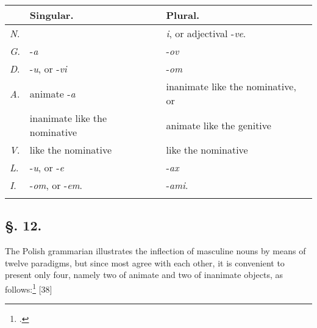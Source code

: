 \newpage

\begin{longtable}{ l l l }
    \lsptoprule
    & Singular. & Plural. \\
    \midrule
    \textit{N}. & & \textit{i}, or adjectival -\textit{ve}. \\
    \textit{G}. & -\textit{a} & -\textit{ov} \\
    \textit{D}. & -\textit{u}, or -\textit{vi} & -\textit{om} \\ 
    \textit{A}. & animate -\textit{a} & inanimate like the nominative, or \\
    & inanimate like the nominative & animate like the genitive \\
    \textit{V}. & like the nominative & like the nominative \\
    \textit{L}. & -\textit{u}, or -\textit{e} & -\textit{ax} \\
    \textit{I}. & -\textit{om}, or -\textit{em}. & -\textit{ami}. \\
    \lspbottomrule
\end{longtable}

\subsection*{\hspace*{\fill}§. 12.\hspace*{\fill}}

The Polish grammarian illustrates the inflection of masculine nouns by means of twelve paradigms, but since most agree with each other, it is convenient to present only four, namely two of animate and two of inanimate objects, as follows:\footnote{\citet[47--49]{bandtkie_polnische_1808}.} [38]

